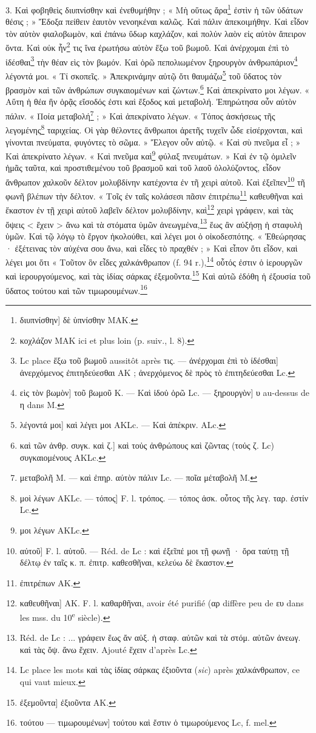 \documentclass[a4paper, 11pt, oneside, polutonikogreek, french]{article}
\begin{document}
3. Καὶ φοβηθεὶς διυπνίσθην καὶ ἐνεθυμήθην ; « Μὴ οὕτως ἄρα\footnote{διυπνίσθην] δὲ ὑπνίσθην MAK.} ἐστὶν ἡ τῶν ὑδάτων θέσις ; » Ἔδοξα πείθειν ἑαυτὸν νενοηκέναι καλῶς. Καὶ πάλιν ἀπεκοιμήθην. Καὶ εἶδον τὸν αὐτὸν φιαλοβωμὸν, καὶ ἐπάνω ὕδωρ καχλάζον, καὶ πολὐν λαὸν εἰς αὐτὸν ἄπειρον ὄντα. Καὶ οὐκ ἧν\footnote{κοχλάζον MAK ici et plus loin (p. suiv., l. 8).} τις ἵνα ἐρωτήσω αὐτὸν ἔξω τοῦ βωμοῦ. Καὶ ἀνέρχομαι ἐπὶ τὸ ἰδέσθαι\footnote{Lc place ἔξω τοῦ βωμοῦ aussitôt après τις. --- ἀνέρχομαι ἐπὶ τὸ ίδέσθαι] ἀνερχόμενος ἐπιτηδεύεσθαι AK ; ἀνερχόμενος δὲ πρὸς τὸ ἐπιτηδεύεσθαι Lc.} τὴν θέαν εὶς τὸν βωμόν. Καὶ ὁρῶ πεπολιωμένον ξηρουργὸν ἀνθρωπάριον\footnote{εὶς τὸν βωμὸν] τοῦ βωμοῦ K. --- Καὶ ἰδοὐ ὁρῶ Lc. --- ξηρουργὸν] υ au-dessus de η dans M.} λέγοντά μοι. « Τί σκοπεῖς. » Ἀπεκρινάμην αὐτῷ ὅτι θαυμάζω\footnote{λέγοντά μοι] καὶ λέγει μοι AKLc. --- Καὶ ἀπέκριν. ALc.} τοῦ ὕδατος τὸν βρασμὸν καὶ τῶν ἀνθρώπων συγκαιομένων καὶ ζώντων.\footnote{καὶ τῶν ἀνθρ. συγκ. καὶ ζ.] καὶ τοὐς ἀνθρώπους καὶ ζῶντας (τοὐς ζ. Lc) συγκαιομένους AKLc.} Καὶ ἀπεκρίνατο μοι λέγων. « Αὕτη ἡ θέα ἣν ὁρᾷς εἴσοδός ἐστι καὶ ἔξοδος καὶ μεταβολή. Ἐπηρώτησα οὖν αὐτὸν πάλιν. « Ποία μεταβολή\footnote{μεταβολῆ M. --- καὶ ἐπηρ. αύτὸν πάλιν Lc. --- ποῖα μέταβολῆ M.} ; » Καὶ ἀπεκρίνατο λέγων. « Τόπος ἀσκήσεως τῆς λεγομένης\footnote{μοὶ λέγων AKLc. --- τόπος] F. l. τρόπος. --- τόπος ἀσκ. οὗτος τῆς λεγ. ταρ. ἐστίν Lc.} ταριχείας. Οἱ γὰρ θέλοντες ἄνθρωποι ἀρετῆς τυχεῖν ὧδε εἰσέρχονται, καὶ γίνονται πνεύματα, φυγόντες τὸ σῶμα. » Ἔλεγον οὖν αὐτῷ. « Καὶ σὺ πνεῦμα εἶ ; » Καὶ ἀπεκρίνατο λέγων. « Καὶ πνεῦμα καὶ\footnote{μοι λέγων AKLc.} φύλαξ πνευμάτων. » Καὶ ἐν τῷ ὁμιλεῖν ἡμᾶς ταῦτα, καὶ προστιθεμένου τοῦ βρασμοῦ καὶ τοῦ λαοῦ ὁλολύζοντος, εἶδον ἄνθρωπον χαλκοῦν δέλτον μολυβδίνην κατέχοντα ἐν τῆ χειρὶ αὐτοῦ. Καὶ ἐξεῖπεν\footnote{αὐτοῦ] F. l. αὑτοῦ. --- Réd. de Lc : καὶ ἐξεῖπέ μοι τῇ φωνῇ · ὄρα ταύτῃ τῇ δέλτῳ ἐν ταῖς κ. π. ἐπιτρ. καθεσθῆναι, κελεύω δὲ ἕκαστον.} τῆ φωνῆ βλέπων τὴν δέλτον. « Τοῖς ἐν ταῖς κολάσεσι πᾶσιν ἐπιτρέπω\footnote{ἐπιτρέπων AK.} καθευθῆναι καὶ ἕκαστον ἐν τῇ χειρὶ αὐτοῦ λαβεῖν δέλτον μολυβδίνην, καὶ\footnote{καθευθῆναι] AK. F. l. καθαρθῆναι, avoir été purifié (αρ diffère peu de ευ dans les mss. du 10\textsuperscript{e} siècle).} χειρὶ γράφειν, καὶ τὰς ὄψεις < ἔχειν > ἄνω καὶ τὰ στόματα ὑμῶν ἀνεωγμένα,\footnote{Réd. de Lc : ... γράφειν ἕως ἄν αὐξ. ἡ σταφ. αὐτῶν καὶ τὰ στόμ. αὐτῶν ἀνεωγ. καὶ τὰς ὄψ. ἄνω ἔχειν. Ajouté ἔχειν d'après Lc.} ἕως ἂν αὐξήσῃ ἡ σταφυλὴ ὑμῶν. Καὶ τῷ λόγῳ τὸ ἔργον ἠκολούθει, καὶ λέγει μοι ὁ οἰκοδεσπότης. « Ἐθεώρησας · ἐξέτεινας τὸν αὐχένα σου ἄνω, καὶ εἶδες τὸ πραχθέν ; » Καὶ εἶπον ὄτι εἶδον, καὶ λέγει μοι ὅτι « Τοῦτον ὃν εἶδες χαλκάνθρωπον (f. 94 r.),\footnote{Lc place les mots καὶ τὰς ἰδίας σάρκας ἐξιοῦντα (\emph{sic}) après χαλκάνθρωπον, ce qui vaut mieux.} οὗτός ἐστιν ὁ ἱερουργῶν καὶ ἱερουργούμενος, καὶ τὰς ἰδίας σάρκας ἐξεμοῦντα.\footnote{ἐξεμοῦντα] ἐξιοῦντα AK.} Καὶ αὐτῶ ἐδόθη ἡ ἐξουσία τοῦ ὕδατος τούτου καὶ τῶν τιμωρουμένων.\footnote{τούτου --- τιμωρουμένων] τούτου καὶ ἔστιν ὁ τιμωρούμενος Lc, f. mel.}
\end{document}
